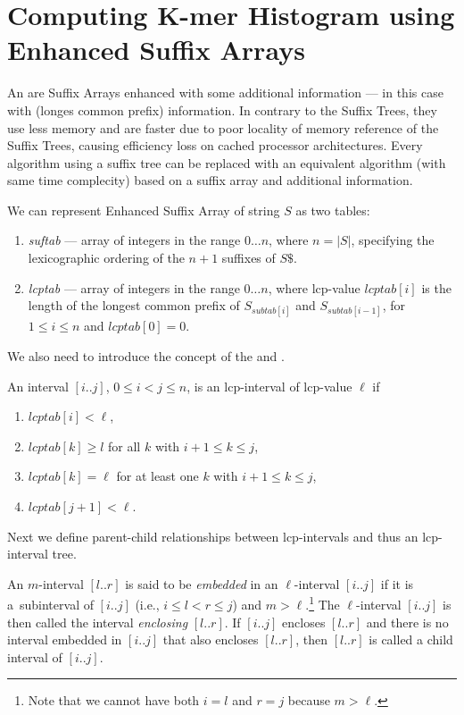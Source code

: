 \section{Computing K-mer Histogram using Enhanced Suffix Arrays}

An  are Suffix Arrays enhanced with some additional information --- in this case with  (longes common prefix) information.
In contrary to the Suffix Trees, they use less memory and are faster due to poor locality of memory reference of the Suffix Trees, causing efficiency loss on cached processor architectures.
Every algorithm using a suffix tree can be replaced with an equivalent
algorithm (with same time complecity) based on a suffix array and additional information\cite{enhancedsuffixarrays}.

We can represent Enhanced Suffix Array of string $S$ as two tables:
\begin{enumerate}
  \item \emph{suftab} --- array of integers in the range $0\dots n$, where $n = |S|$, specifying the lexicographic ordering of the $n + 1$ suffixes of $S\$ $.
  \item \emph{lcptab} --- array of integers in the range $0\dots n$, where lcp-value $lcptab[i]$ is the length of the longest common prefix of $S_{subtab[i]}$ and $S_{subtab[i-1]}$, for $1 \leq i \leq n$ and $lcptab[0] = 0$.
\end{enumerate}

We also need to introduce the concept of the  and .
\begin{definition}
An interval $[i..j]$, $0 \leq i < j \leq n$, is an lcp-interval of lcp-value $\ell$ if

\begin{enumerate}
\item $lcptab[i] < \ell$,
\item $lcptab[k] \geq l$ for all $k$ with $i + 1 \leq k \leq j$,
\item $lcptab[k] = \ell$ for at least one $k$ with $i + 1 \leq k \leq j$,
\item $lcptab[j + 1] < \ell$.
\end{enumerate}
\cite{enhancedsuffixarrays}
\end{definition}

Next we define parent-child relationships between lcp-intervals and thus an lcp-interval tree.

\begin{definition}
  An $m$-interval $[l..r]$ is said to be \emph{embedded} in an $\ell$-interval $[i..j]$ if it is a~subinterval of $[i..j]$ (i.e., $i \leq l < r \leq j $) and $m > \ell$.\footnote{Note that we cannot have both $i = l$ and $r = j$ because $m > \ell$.}
  The $\ell$-interval $[i..j ]$ is then called the interval \emph{enclosing} $[l..r]$. If $[i..j]$ encloses $[l..r]$ and there is no interval embedded in $[i..j]$ that also encloses $[l..r]$, then $[l..r]$ is called a child interval of $[i..j]$.\cite{enhancedsuffixarrays}
\end{definition}

